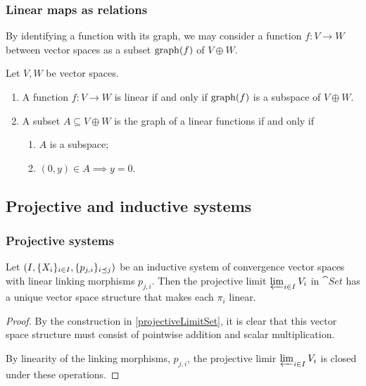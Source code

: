 \subsubsection{Linear maps as relations}
By identifying a function with its graph, we may consider a function $f: V\to W$ between vector spaces as a subset $\operatorname{graph}(f)$ of $V\oplus W$.

\begin{proposition}
Let $V,W$ be vector spaces.
\begin{enumerate}
\item A function $f: V\to W$ is linear \textup{if and only if} $\operatorname{graph}(f)$ is a subspace of $V\oplus W$.
\item A subset $A\subseteq V\oplus W$ is the graph of a linear functions \textup{if and only if}
\begin{enumerate}
\item $A$ is a subspace;
\item $(0,y)\in A \implies y=0$.
\end{enumerate}
\end{enumerate}
\end{proposition}

\subsection{Projective and inductive systems}
\subsubsection{Projective systems}
\begin{proposition} \label{vectorSpaceProjectiveLimit}
Let $\sSet{I, \{X_i\}_{i\in I}, \{p_{j,i}\}_{i\preceq j}}$ be an inductive system of convergence vector spaces with linear linking morphisms $p_{j,i}$. Then the projective limit $\varprojlim_{i\in I} V_i$ in $\cat{Set}$ has a unique vector space structure that makes each $\pi_i$ linear.
\end{proposition}
\begin{proof}
By the construction in \ref{projectiveLimitSet}, it is clear that this vector space structure must consist of pointwise addition and scalar multiplication.

By linearity of the linking morphisms, $p_{j,i}$, the projective limir $\varprojlim_{i\in I}V_i$ is closed under these operations.
\end{proof}


